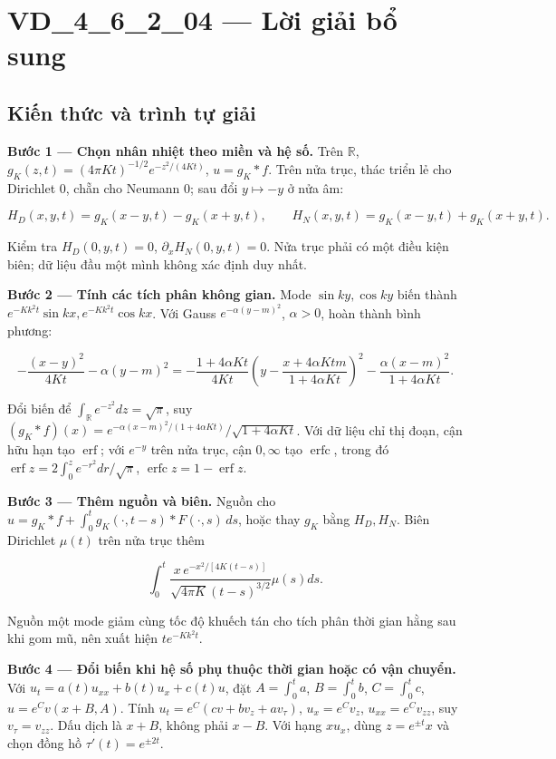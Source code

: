 \documentclass[10pt,a4paper]{article}
\begin{document}
\section*{VD\_4\_6\_2\_04 — Lời giải bổ sung}
\subsection*{Kiến thức và trình tự giải}
\textbf{Bước 1 — Chọn nhân nhiệt theo miền và hệ số.} Trên $\mathbb R$, $g_K(z,t)=(4\pi Kt)^{-1/2}e^{-z^2/(4Kt)}$, $u=g_K*f$. Trên nửa trục, thác triển lẻ cho Dirichlet $0$, chẵn cho Neumann $0$; sau đổi $y\mapsto-y$ ở nửa âm:


\[
H_D(x,y,t)=g_K(x-y,t)-g_K(x+y,t),\qquad
H_N(x,y,t)=g_K(x-y,t)+g_K(x+y,t).
\]


Kiểm tra $H_D(0,y,t)=0$, $\partial_xH_N(0,y,t)=0$. Nửa trục phải có một điều kiện biên; dữ liệu đầu một mình không xác định duy nhất.

\textbf{Bước 2 — Tính các tích phân không gian.} Mode $\sin ky,\cos ky$ biến thành $e^{-Kk^2t}\sin kx,e^{-Kk^2t}\cos kx$. Với Gauss $e^{-\alpha(y-m)^2}$, $\alpha>0$, hoàn thành bình phương:


\[
-\frac{(x-y)^2}{4Kt}-\alpha(y-m)^2
=-\frac{1+4\alpha Kt}{4Kt}\left(y-\frac{x+4\alpha Ktm}{1+4\alpha Kt}\right)^2
-\frac{\alpha(x-m)^2}{1+4\alpha Kt}.
\]


Đổi biến để $\int_{\mathbb R}e^{-z^2}dz=\sqrt\pi$, suy $(g_K*f)(x)=e^{-\alpha(x-m)^2/(1+4\alpha Kt)}/\sqrt{1+4\alpha Kt}$. Với dữ liệu chỉ thị đoạn, cận hữu hạn tạo $\operatorname{erf}$; với $e^{-y}$ trên nửa trục, cận $0,\infty$ tạo $\operatorname{erfc}$, trong đó $\operatorname{erf}z=2\int_0^ze^{-r^2}dr/\sqrt\pi$, $\operatorname{erfc}z=1-\operatorname{erf}z$.

\textbf{Bước 3 — Thêm nguồn và biên.} Nguồn cho $u=g_K*f+\int_0^tg_K(\cdot,t-s)*F(\cdot,s)\,ds$, hoặc thay $g_K$ bằng $H_D,H_N$. Biên Dirichlet $\mu(t)$ trên nửa trục thêm


\[
\int_0^t\frac{x\,e^{-x^2/[4K(t-s)]}}{\sqrt{4\pi K}(t-s)^{3/2}}\mu(s)ds.
\]


Nguồn một mode giảm cùng tốc độ khuếch tán cho tích phân thời gian hằng sau khi gom mũ, nên xuất hiện $te^{-Kk^2t}$.

\textbf{Bước 4 — Đổi biến khi hệ số phụ thuộc thời gian hoặc có vận chuyển.} Với $u_t=a(t)u_{xx}+b(t)u_x+c(t)u$, đặt $A=\int_0^ta$, $B=\int_0^tb$, $C=\int_0^tc$, $u=e^Cv(x+B,A)$. Tính $u_t=e^C(cv+bv_z+av_\tau)$, $u_x=e^Cv_z$, $u_{xx}=e^Cv_{zz}$, suy $v_\tau=v_{zz}$. Dấu dịch là $x+B$, không phải $x-B$. Với hạng $xu_x$, dùng $z=e^{\pm t}x$ và chọn đồng hồ $\tau'(t)=e^{\pm2t}$.
\end{document}
